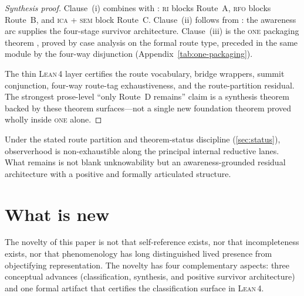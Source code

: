 \documentclass[11pt]{article}
\theoremstyle{plain}
\theoremstyle{definition}
\theoremstyle{remark}
\newcommand{\ONE}{\textsc{one}}
\newcommand{\RI}{\textsc{ri}}
\newcommand{\RFO}{\textsc{rfo}}
\newcommand{\ICA}{\textsc{ica}}
\newcommand{\SEM}{\textsc{sem}}
\newcommand{\Lean}{\textsc{Lean\,4}}
\begin{document}
\begin{proof}[Synthesis proof]
Clause~(i) combines  with :
\RI{} blocks Route~A, \RFO{} blocks Route~B, and \ICA{} + \SEM{} block
Route~C.  Clause~(ii) follows
from : the awareness arc supplies the four-stage survivor
architecture.  Clause~(iii) is the \ONE{} packaging theorem
, proved by case
analysis on the formal route type, preceded in the same module by the
four-way disjunction 
(Appendix~\ref{tab:one-packaging}).

The thin \Lean{} layer certifies the route vocabulary, bridge wrappers,
summit conjunction, four-way route-tag exhaustiveness, and the
route-partition residual.  The strongest
prose-level ``only Route~D remains'' claim is a synthesis theorem backed
by these theorem surfaces---not a single new foundation theorem proved
wholly inside \ONE{} alone.
\end{proof}

\begin{keybox}[title={Formal summit}]
Under the stated route partition and theorem-status discipline
(\cref{sec:status}), observerhood is non-exhaustible along the principal
internal reductive lanes.  What remains is not blank unknowability but an
awareness-grounded residual architecture with a positive and formally
articulated structure.
\end{keybox}

\section{What is new}
\label{sec:novelty}

The novelty of this paper is not that self-reference exists, nor that
incompleteness exists, nor that phenomenology has long distinguished lived
presence from objectifying representation.  The novelty has four
complementary aspects: three conceptual advances (classification,
synthesis, and positive survivor architecture) and one formal artifact
that certifies the classification surface in \Lean.
\end{document}
